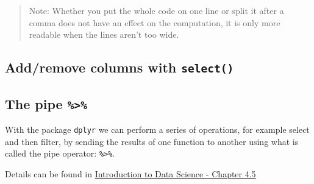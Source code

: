 \documentclass[
  a4paperpaper,
]{book}
\newenvironment{Shaded}{\begin{snugshade}}{\end{snugshade}}
\newcommand{\CommentTok}[1]{\textcolor[rgb]{0.56,0.35,0.01}{\textit{#1}}}
\newcommand{\DataTypeTok}[1]{\textcolor[rgb]{0.13,0.29,0.53}{#1}}
\newcommand{\DecValTok}[1]{\textcolor[rgb]{0.00,0.00,0.81}{#1}}
\newcommand{\FloatTok}[1]{\textcolor[rgb]{0.00,0.00,0.81}{#1}}
\newcommand{\KeywordTok}[1]{\textcolor[rgb]{0.13,0.29,0.53}{\textbf{#1}}}
\newcommand{\NormalTok}[1]{#1}
\newcommand{\OperatorTok}[1]{\textcolor[rgb]{0.81,0.36,0.00}{\textbf{#1}}}
\newcommand{\StringTok}[1]{\textcolor[rgb]{0.31,0.60,0.02}{#1}}
\let\oldShaded\Shaded
\let\endoldShaded\endShaded
\renewenvironment{Shaded}{\footnotesize\oldShaded}{\endoldShaded}
\begin{document}
\begin{quote}
Note: Whether you put the whole code on one line or split it after a comma does not have an effect on the computation, it is only more readable when the lines aren't too wide.
\end{quote}

\newpage

\hypertarget{addremove-columns-with-select}{%
\subsection{\texorpdfstring{Add/remove columns with \texttt{select()}}{Add/remove columns with select()}}\label{addremove-columns-with-select}}

\begin{Shaded}
\end{Shaded}

\hypertarget{the-pipe}{%
\subsection{\texorpdfstring{The pipe \texttt{\%\textgreater{}\%}}{The pipe \%\textgreater\%}}\label{the-pipe}}

With the package \texttt{dplyr} we can perform a series of operations, for example select and then filter, by sending the results of one function to another using what is called the pipe operator: \texttt{\%\textgreater{}\%}.

Details can be found in \href{https://rafalab.github.io/dsbook/tidyverse.html}{Introduction to Data Science - Chapter 4.5}
\end{document}

